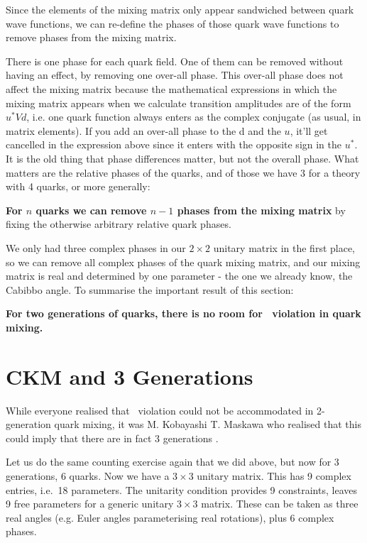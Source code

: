  Since the elements of the mixing matrix only appear sandwiched
 between quark wave functions, we can re-define the phases of those
 quark wave functions to remove phases from the mixing matrix.

 There is one phase for each quark field. One of them can be removed
 without having an effect, by removing one over-all phase. This
 over-all phase does not affect the mixing matrix because the
 mathematical expressions in which the mixing matrix appears when we
 calculate transition amplitudes are of the form $u^* V d$, i.e. one
 quark function always enters as the complex conjugate (as usual, in
 matrix elements). If you add an over-all phase to the d and the $u$,
 it'll get cancelled in the expression above since it enters with the
 opposite sign in the $u^*$. It is the old thing that phase
 differences matter, but not the overall phase. What matters are the
 relative phases of the quarks, and of those we have $3$ for a theory
 with 4 quarks, or more generally:

 \textbf{For $n$ quarks we can remove $n-1$ phases from the mixing
 matrix} by fixing the otherwise arbitrary relative quark phases.

 We only had three complex phases in our $2\times 2$ unitary matrix in
 the first place, so we can remove all complex phases of the quark
 mixing matrix, and our mixing matrix is real and determined by one
 parameter - the one we already know, the Cabibbo angle. To summarise
 the important result of this section:

\textbf{For two generations of quarks, there is no room for \cp\
 violation in quark mixing.}

\section{CKM and 3 Generations}

 While everyone realised that \cp\ violation could not be accommodated
 in 2-generation quark mixing, it was M. Kobayashi T. Maskawa who
 realised that this could imply that there are in fact 3 generations
 \cite{progtp.km}.

 Let us do the same counting exercise again that we did above, but now
 for 3 generations, 6 quarks. Now we have a $3\times 3$ unitary
 matrix. This has 9 complex entries, i.e.~18 parameters. The unitarity
 condition provides 9 constraints, leaves 9 free parameters for a
 generic unitary $3\times 3$ matrix. These can be taken as three real
 angles (e.g. Euler angles parameterising real rotations), plus 6
 complex phases.

